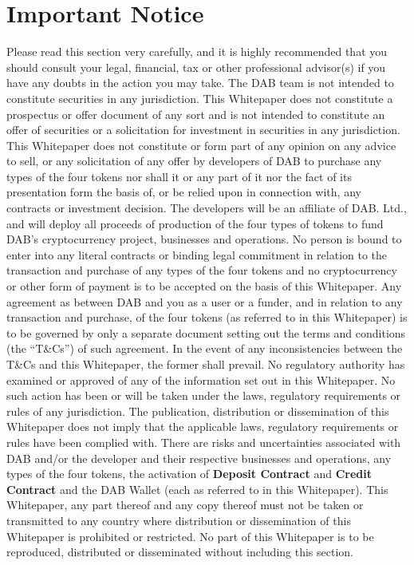 \documentclass[review]{elsarticle}
\begin{document}
\section{Important Notice}
Please read this section very carefully, and it is highly recommended that you should consult your legal, financial, tax or other professional advisor(s) if you have any doubts in the action you may take.
The DAB team is not intended to constitute securities in any jurisdiction. This Whitepaper does not constitute a prospectus or offer document of any sort and is not intended to constitute an offer of securities or a solicitation for investment in securities in any jurisdiction. 
This Whitepaper does not constitute or form part of any opinion on any advice to sell, or any solicitation of any offer by developers of DAB to purchase any types of the four tokens nor shall it or any part of it nor the fact of its presentation form the basis of, or be relied upon in connection with, any contracts or investment decision. 
The developers will be an affiliate of DAB. Ltd., and will deploy all proceeds of production of the four types of tokens to fund DAB's cryptocurrency project, businesses and operations. 
No person is bound to enter into any literal contracts or binding legal commitment in relation to the transaction and purchase of any types of the four tokens and no cryptocurrency or other form of payment is to be accepted on the basis of this Whitepaper. 
Any agreement as between DAB and you as a user or a funder, and in relation to any transaction and purchase, of the four tokens (as referred to in this Whitepaper) is to be governed by only a separate document setting out the terms and conditions (the ``T\&Cs'') of such agreement. In the event of any inconsistencies between the T\&Cs and this Whitepaper, the former shall prevail.
No regulatory authority has examined or approved of any of the information set out in this Whitepaper. No such action has been or will be taken under the laws, regulatory requirements or rules of any jurisdiction. The publication, distribution or dissemination of this Whitepaper does not imply that the applicable laws, regulatory requirements or rules have been complied with. 
There are risks and uncertainties associated with DAB and/or the developer and their respective businesses and operations, any types of the four tokens, the activation of \textbf{Deposit Contract} and \textbf{Credit Contract} and the DAB Wallet (each as referred to in this Whitepaper). 
This Whitepaper, any part thereof and any copy thereof must not be taken or transmitted to any country where distribution or dissemination of this Whitepaper is prohibited or restricted. 
No part of this Whitepaper is to be reproduced, distributed or disseminated without including this section.
\end{document}
